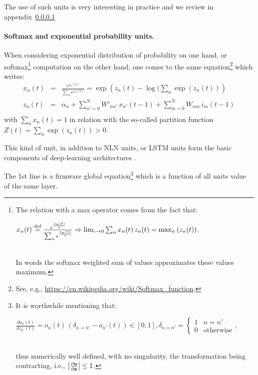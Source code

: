 The use of such units is very interesting in practice and we review in appendix~\ref{}

\paragraph{Softmax and exponential probability units.} 

When considering exponential distribution of probability on one hand, or softmax\footnote{
The relation with a max operator comes from the fact that:
\\\centerline{$x_n(t) \stackrel {\rm def}{=} \frac{e^{\frac{z_n(t)}{\epsilon}}}{\sum_n e^{\frac{z_n(t)}{\epsilon}}} \Rightarrow \lim_{\epsilon \rightarrow 0} \sum_n x_n(t) \, z_n(t) = \max_n \left( z_n(t)\right)$.}\\ In words the softmax weighted sum of values approximates these values maximum.} computation on the other hand, one comes to the same equation\footnote{See, e.g., \url{https://en.wikipedia.org/wiki/Softmax\_function}.} which writes: \begin{equation}\label{exp-network}\begin{array}{rcl}
x_n(t) &=& \frac{e^{z_n(t)}}{\sum_n e^{z_n(t)}} = \exp\left(z_n(t) - \log(\sum_n \exp\left(z_n(t)\right)\right) \\
z_n(t) &=& \alpha_n + \sum_{n' = 0}^{N} W'_{nn'} \, x_{n'}(t-1) + \sum_{m = 0}^{N} W_{nm} \, i_m(t-1) \\
\end{array} \end{equation} with $\sum_n x_n(t) = 1$ in relation with the so-called partition function $Z(t) = \sum_n \exp\left(z_n(t)\right) > 0$. 

This kind of unit, in addition to NLN units, or LSTM units form the basic components of deep-learning architectures \cite{Bengio:2009,Deng:2014}.

The 1st line is a firmware global equation\footnote{It is worthwhile mentioning that: \\\centerline{$\frac{\partial o_n(t)}{\partial z_{n'}(t)} = o_n(t) \, \left(\delta_{n=n'} - o_{n'}(t)\right) \in [0,1], \delta_{n=n'} = \left\{\begin{array}{cl} 1 & n = n' \\ 0 & \mbox{otherwise} \end{array}\right.$,} \\ thus numerically well defined, with no singularity, the transformation being contracting, i.e., $\left|\frac{\partial {\bf o}}{\partial {\bf z}}\right| \leq 1$.} which is a function of all units value of the same layer.

